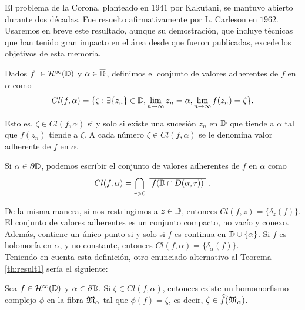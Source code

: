 \begin{obs}
    El problema de la Corona, planteado en $1941$ por Kakutani, se mantuvo abierto durante dos décadas. Fue resuelto afirmativamente por L. Carleson en $1962$. Usaremos en breve este resultado, aunque su demostración, que incluye técnicas que han tenido gran impacto en el área desde que fueron publicadas, excede los objetivos de esta memoria. \\
\end{obs}

\begin{definition}
    Dados $f \in \bholomorphic{\disk}$ y $\alpha \in \overline{\mathbb{D}}$, definimos el conjunto de valores adherentes de $f$ en $\alpha$ como
    \begin{equation*}
        Cl(f, \alpha) = \{\zeta : \exists \{z_n\} \in \mathbb{D}, \lim_{n \to \infty} z_n = \alpha, \lim_{n \to \infty} f(z_n) = \zeta \}.
    \end{equation*}

    Esto es, $\zeta \in Cl(f, \alpha)$ si y solo si existe una sucesión $z_n$ en $\mathbb{D}$ que tiende a $\alpha$ tal que $f(z_n)$ tiende a $\zeta$. A cada número $\zeta \in Cl(f, \alpha)$ se le denomina valor adherente de $f$ en $\alpha$.
\end{definition}

\medskip

Si $\alpha \in \partial \mathbb{D}$, podemos escribir el conjunto de valores adherentes de $f$ en $\alpha$ como
\begin{equation}
    Cl(f, \alpha) = \bigcap_{r>0} \xbar{f(\disk \cap D(\alpha, r))}.
\end{equation}

De la misma manera, si nos restringimos a $z \in \mathbb{D}$, entonces $Cl(f, z) = \{\delta_z(f)\}$. \\

El conjunto de valores adherentes es un conjunto compacto, no vacío y conexo. Además, contiene un único punto si y solo si $f$ es continua en $\mathbb{D} \cup \{\alpha\}$. Si $f$ es holomorfa en $\alpha$, y no constante, entonces $Cl(f, \alpha) = \{\delta_\alpha(f)\}$. \\

Teniendo en cuenta esta definición, otro enunciado alternativo al Teorema \ref{th:result1} sería el siguiente: \\

\begin{theorem}
    Sea $f \in \bholomorphic{\disk}$ y $\alpha \in \partial \mathbb{D}$. Si $\zeta \in Cl(f, \alpha)$, entonces existe un homomorfismo complejo $\phi$ en la fibra $\mathfrak{M}_\alpha$ tal que $\phi(f) = \zeta$, es decir, $\zeta \in \widehat f (\mathfrak{M}_\alpha)$. \\
\end{theorem}

